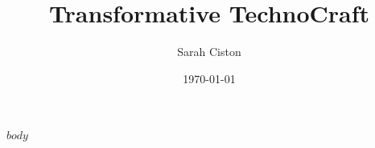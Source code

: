 \documentclass[10pt,oneside]{scrartcl}
\title{Trans\*formative TechnoCraft}
\author{Sarah Ciston}
\date{\today}
\begin{document}
\maketitle
\renewcommand{\contentsname}{Table of Contents}
\tableofcontents
\listoffigures


$body$
\end{document}
